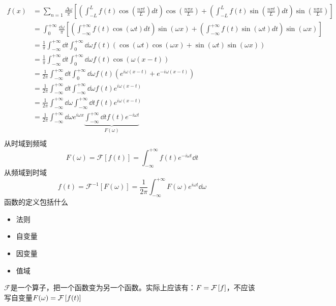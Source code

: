 \begin{equation*}
	\begin{aligned}
		f(x)
		 & =
		\sum_{n=1}
		\frac{\Delta \omega}{\pi}\left[
			\left(
			\int_{-L}^{L}  f(t) \cos(\frac{n \pi t}{L}) d t
			\right)
			\cos(\frac{n \pi x}{L})  +
			\left( \int_{-L}^{L}  f(t) \sin(\frac{n \pi t}{L}) d t \right)
			\sin(\frac{n \pi x}{L})
		\right]            \\
		 & =
		\int_0^{+\infty}
		\frac{\dd \omega}{\pi}\left[
			\left(
			\int_{-\infty}^{+\infty}  f(t) \cos(\omega t) d t
			\right)
			\sin(\omega x)  +
			\left( \int_{-\infty}^{+\infty}  f(t) \sin(\omega t) d t \right)
			\sin(\omega x)
		\right]            \\
		 & =
		\frac{1}{ \pi}
		\int_{-\infty}^{+\infty} \dd t
		\int_{0}^{+\infty} \dd \omega
		f(t)
		\left(
		\cos(\omega t) \cos(\omega x)
		+
		\sin(\omega t) \sin(\omega x)
		\right)            \\
		 & =
		\frac{1}{ \pi}
		\int_{-\infty}^{+\infty} \dd t
		\int_{0}^{+\infty} \dd \omega
		f(t)
		\cos(\omega (x-t)) \\
		 & =
		\frac{1}{ 2 \pi}
		\int_{-\infty}^{+\infty} \dd t
		\int_{0}^{+\infty} \dd \omega
		f(t)
		\left(
		e^{i \omega (x-t)}
		+
		e^{-i \omega (x-t)}
		\right)            \\
		 & =
		\frac{1}{2 \pi}
		\int_{-\infty}^{+\infty} \dd t
		\int_{-\infty}^{+\infty} \dd \omega
		f(t)
		e^{i \omega (x-t)} \\
		 & =
		\frac{1}{2 \pi}
		\int_{-\infty}^{+\infty} \dd \omega
		\int_{-\infty}^{+\infty} \dd t
		f(t)
		e^{i \omega (x-t)} \\
		 & =
		\frac{1}{2 \pi}
		\int_{-\infty}^{+\infty} \dd \omega
		e^{i \omega x}
		\underbrace{
			\int_{-\infty}^{+\infty} \dd t
			f(t)
			e^{-i \omega t}}_{F(\omega)}
		\\
	\end{aligned}
\end{equation*}
从时域到频域
\begin{equation*}
	F(\omega)=\mathcal{F}[f(t)]
	=
	\int_{-\infty}^{+\infty}
	f(t)
	e^{-i \omega t} \dd t
\end{equation*}
从频域到时域
\begin{equation*}
	f(t)=\mathcal{F}^{-1}[F(\omega)]
	=
	\frac{1}{2 \pi}
	\int_{-\infty}^{+\infty}
	F(\omega)
	e^{i \omega t} \dd \omega
\end{equation*}
函数的定义包括什么
\begin{itemize}
	\item 法则
	\item 自变量
	\item 因变量
	\item 值域
\end{itemize}
\(\mathcal{F}\)是一个算子，把一个函数变为另一个函数。实际上应该有：\(F=\mathcal{F}\left[f\right]\)，不应该写自变量\(F(\omega)=\mathcal{F}\left[f(t)\right]\)

